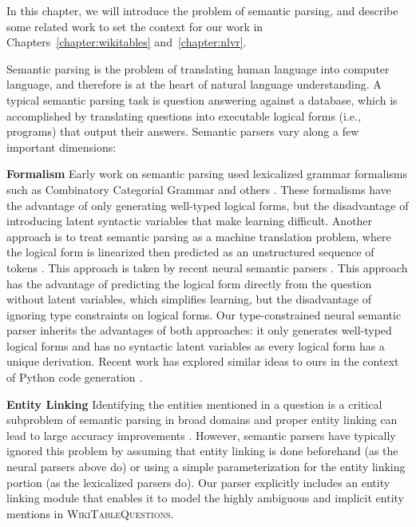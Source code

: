 In this chapter, we will introduce the problem of semantic parsing, and describe some related work to set the context for our work in Chapters~\ref{chapter:wikitables} and~\ref{chapter:nlvr}.

Semantic parsing is the problem of translating human language into computer language, and therefore is at the heart of natural language understanding.
A typical semantic parsing task is question answering against a database, which is accomplished by translating questions into executable logical forms (i.e., programs) that output their answers. Semantic parsers vary along a few important dimensions:

\textbf{Formalism} Early work on semantic parsing used lexicalized grammar formalisms such as Combinatory Categorial Grammar \cite{zettlemoyer05,zettlemoyer2007online,kwiatkowski2011lexical,kwiatkowski2013,krishnamurthy2012weakly,artzi2013} and others \cite{liang2011learning,berant2013,zhao2015,wong2006learning,wong2007learning}. These formalisms have the advantage of only generating well-typed logical forms, but the disadvantage of introducing latent syntactic variables that make learning difficult. Another approach is to treat semantic parsing as a machine translation problem, where the logical form is linearized then predicted as an unstructured sequence of tokens \cite{andreas2013}.
This approach is taken by recent neural semantic parsers \cite{jia2016,dong2016,locascio2016,ling2016}. This approach has the advantage of predicting the logical form directly from the question without latent variables, which simplifies learning, but the disadvantage of ignoring type constraints on logical forms.
Our type-constrained neural semantic parser inherits the advantages of both approaches: it only generates well-typed logical forms and has no syntactic latent variables as every logical form has a unique derivation. Recent work has explored similar ideas to ours in the context of Python code generation \cite{yin17acl,rabinovich17acl}.

\textbf{Entity Linking} Identifying the entities mentioned in a question is a critical subproblem of semantic parsing in broad domains and proper entity linking can lead to large accuracy improvements \cite{yih2015stagg}.
However, semantic parsers have typically ignored this problem by assuming that entity linking is done beforehand (as the neural parsers above do) or using a simple parameterization for the entity linking portion (as the lexicalized parsers do). Our parser explicitly includes an entity linking module that enables it to model the highly ambiguous and implicit entity mentions in \textsc{WikiTableQuestions}.


